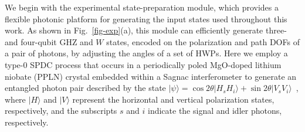 \documentclass[prl,aps,twocolumn,notitlepage,superscriptaddress,showpacs,nofootinbib]{revtex4-2}
\newcommand{\red}[1]{{\color{red} #1}}
\begin{document}
\red{ We begin with the experimental state-preparation module, which provides a flexible photonic platform for generating the input states used throughout this work. As shown in Fig.~\ref{fig-exp}(a), this module can efficiently generate three- and four-qubit GHZ and $W$ states, encoded on the polarization and path DOFs of a pair of photons, by adjusting the angles of a set of HWPs. Here we employ a type-0 SPDC process that occurs in a periodically poled MgO-doped lithium niobate (PPLN) crystal embedded within a Sagnac interferometer to generate an entangled photon pair described by the state $|\psi\rangle=\cos 2\theta |H_sH_i\rangle+\sin 2\theta |V_sV_i\rangle$~\cite{li2022,mao2023}, where $|H\rangle$ and $|V\rangle$ represent the horizontal and vertical polarization states, respectively, and the subscripts $s$ and $i$ indicate the signal and idler photons, respectively. %






}
\end{document}

